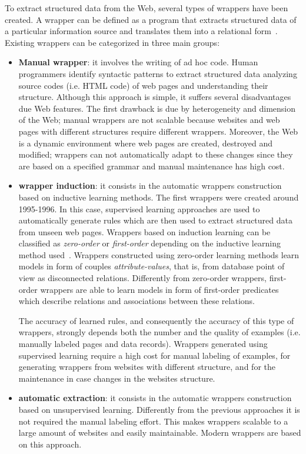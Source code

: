 To extract structured data from the Web, several types of wrappers have been created. A wrapper can be defined as a program that extracts structured data of a particular information source and translates them into a relational form~\cite{Kushmerick:1997}.
Existing wrappers can be categorized in three main groups:
\begin{itemize}
\item \textbf{Manual wrapper}: it involves the writing of ad hoc code. Human programmers identify syntactic patterns to extract structured data analyzing source codes (i.e. HTML code) of web pages and understanding their structure. Although this approach is simple, it suffers several disadvantages due Web features. The first drawback is due by heterogeneity and dimension of the Web; manual wrappers are not scalable %
because websites and web pages with different structures require different wrappers. Moreover, the Web is a dynamic environment where web pages are created, destroyed and modified; wrappers can not automatically adapt to these changes since they are based on a specified grammar and manual maintenance has high cost.  
\item \textbf{wrapper induction}: it consists in the automatic wrappers construction based on inductive learning methods. The first wrappers were created around 1995-1996. In this case,  supervised learning approaches are used to automatically generate rules which are then used to extract structured data from unseen web pages. Wrappers based on induction learning can be classified as \textit{zero-order} or \textit{first-order} depending on the inductive learning method used~\cite{Eikvil:1999}. Wrappers constructed using zero-order learning methods learn models in form of couples \textit{attribute-values}, that is, from database point of view as disconnected relations. Differently from zero-order wrappers, first-order wrappers are able to learn models in form of first-order predicates which describe relations and associations between these relations.   

The accuracy of learned rules, and consequently the accuracy of this type of wrappers, strongly depends both the number and the quality of examples (i.e. manually labeled pages and data records). Wrappers generated using supervised learning require a high cost for manual labeling of examples, for generating wrappers from websites with different structure, and for the maintenance in case changes in the websites structure.
\item \textbf{automatic extraction}: it consists in the automatic wrappers construction based on unsupervised learning. Differently from the previous approaches it is not required the manual labeling effort. This makes wrappers scalable to a large amount of websites and easily maintainable. Modern wrappers are based on this approach.
\end{itemize} 

